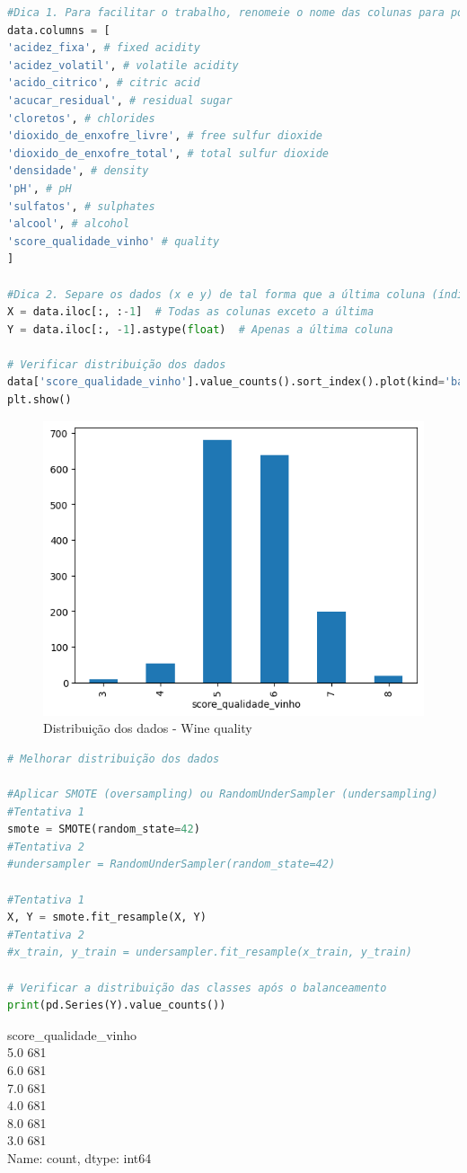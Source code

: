 \begin{lstlisting}[language=Python, style=input]
#Dica 1. Para facilitar o trabalho, renomeie o nome das colunas para português, dessa forma:
data.columns = [
'acidez_fixa', # fixed acidity
'acidez_volatil', # volatile acidity
'acido_citrico', # citric acid
'acucar_residual', # residual sugar
'cloretos', # chlorides
'dioxido_de_enxofre_livre', # free sulfur dioxide
'dioxido_de_enxofre_total', # total sulfur dioxide
'densidade', # density
'pH', # pH
'sulfatos', # sulphates
'alcool', # alcohol
'score_qualidade_vinho' # quality
]

#Dica 2. Separe os dados (x e y) de tal forma que a última coluna (índice -1), chamada score_qualidade_vinho, seja a variável target (y)
X = data.iloc[:, :-1]  # Todas as colunas exceto a última
Y = data.iloc[:, -1].astype(float)  # Apenas a última coluna

# Verificar distribuição dos dados
data['score_qualidade_vinho'].value_counts().sort_index().plot(kind='bar')
plt.show()
\end{lstlisting}
\begin{figure}[H]
\centering
\includegraphics[width=.8\linewidth]{apendices/fig/13_IAA012_5.png}
\caption{Distribuição dos dados - Wine quality}
\end{figure}
\begin{lstlisting}[language=Python, style=input]
# Melhorar distribuição dos dados

#Aplicar SMOTE (oversampling) ou RandomUnderSampler (undersampling)
#Tentativa 1
smote = SMOTE(random_state=42)
#Tentativa 2
#undersampler = RandomUnderSampler(random_state=42)

#Tentativa 1
X, Y = smote.fit_resample(X, Y)
#Tentativa 2
#x_train, y_train = undersampler.fit_resample(x_train, y_train)

# Verificar a distribuição das classes após o balanceamento
print(pd.Series(Y).value_counts())
\end{lstlisting}
\begin{tcolorbox}[myoutputstyle]
score\_qualidade\_vinho\\
5.0    681\\
6.0    681\\
7.0    681\\
4.0    681\\
8.0    681\\
3.0    681\\
Name: count, dtype: int64
\end{tcolorbox}
